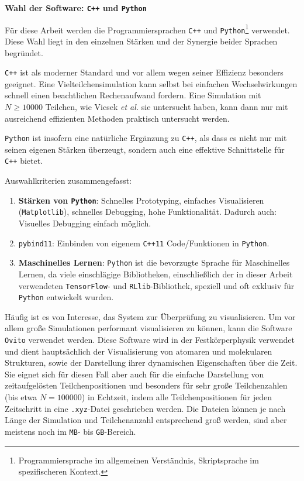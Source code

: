 \documentclass{solutionclass}
\begin{document}
\textbf{Wahl der Software: \texttt{C++} und \texttt{Python}}

Für diese Arbeit werden die Programmiersprachen \texttt{C++} \cite{cpp14} und \texttt{Python}\footnote{Programmiersprache im allgemeinen Verständnis, Skriptsprache im spezifischeren Kontext.} \cite{python310} verwendet. Diese Wahl liegt in den einzelnen Stärken und der Synergie beider Sprachen begründet.

\texttt{C++} ist als moderner Standard und vor allem wegen seiner Effizienz besonders geeignet. Eine Vielteilchensimulation kann selbst bei einfachen Wechselwirkungen schnell einen beachtlichen Rechenaufwand fordern. Eine Simulation mit $N \geq \num{10000}$ Teilchen, wie Vicsek \textit{et al.} sie untersucht haben, kann dann nur mit ausreichend effizienten Methoden praktisch untersucht werden.

\texttt{Python} ist insofern eine natürliche Ergänzung zu \texttt{C++}, als dass es nicht nur mit seinen eigenen Stärken überzeugt, sondern auch eine effektive Schnittstelle für \texttt{C++} bietet.

Auswahlkriterien zusammengefasst:

\begin{enumerate}
    \item \textbf{Stärken von \texttt{Python}}: Schnelles Prototyping, einfaches Visualisieren (\texttt{Matplotlib}), schnelles Debugging, hohe Funktionalität. Dadurch auch: Visuelles Debugging einfach möglich.
    \item \texttt{pybind11}\cite{pybind11}: Einbinden von eigenem \texttt{C++11} Code/Funktionen in \texttt{Python}.
    \item \textbf{Maschinelles Lernen}: \texttt{Python} ist die bevorzugte Sprache für Maschinelles Lernen, da viele einschlägige Bibliotheken, einschließlich der in dieser Arbeit verwendeten \texttt{TensorFlow}- und \texttt{RLlib}-Bibliothek, speziell und oft exklusiv für \texttt{Python} entwickelt wurden.
\end{enumerate}

Häufig ist es von Interesse, das System zur Überprüfung zu visualisieren. Um vor allem große Simulationen performant visualisieren zu können, kann die Software \texttt{Ovito} \cite{OVITO2010} verwendet werden. Diese Software wird in der Festkörperphysik verwendet und dient hauptsächlich der Visualisierung von atomaren und molekularen Strukturen, sowie der Darstellung ihrer dynamischen Eigenschaften über die Zeit. Sie eignet sich für diesen Fall aber auch für die einfache Darstellung von zeitaufgelösten Teilchenpositionen und besonders für sehr große Teilchenzahlen (bis etwa $N = \num{100000}$) in Echtzeit, indem alle Teilchenpositionen für jeden Zeitschritt in eine \texttt{.xyz}-Datei geschrieben werden. Die Dateien können je nach Länge der Simulation und Teilchenanzahl entsprechend groß werden, sind aber meistens noch im \texttt{MB}- bis \texttt{GB}-Bereich.\\
\end{document}
